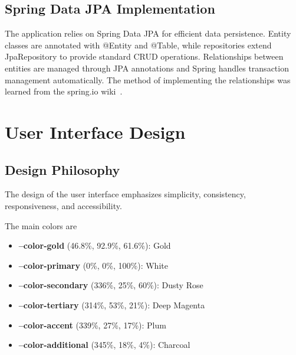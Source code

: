 \subsection{Spring Data JPA Implementation}\label{subsec:spring-data-jpa}

The application relies on Spring Data JPA for efficient data persistence.
Entity classes are annotated with @Entity and @Table, while repositories extend JpaRepository to provide standard CRUD operations.
Relationships between entities are managed through JPA annotations and Spring handles transaction management automatically.
The method of implementing the relationships was learned from the spring.io wiki~\cite{SpringDataJPA2024}.

\section{User Interface Design}\label{sec:ui-design}

\subsection{Design Philosophy}\label{subsec:design-philosophy}
The design of the user interface emphasizes simplicity, consistency, responsiveness, and accessibility.



The main colors are
\begin{itemize}
    \item \textcolor{colorGold}{\textbf{--color-gold} (46.8\%, 92.9\%, 61.6\%): Gold}
    \item \textbf{--color-primary} (0\%, 0\%, 100\%): White
    \item \textcolor{colorSecondary}{\textbf{--color-secondary} (336\%, 25\%, 60\%): Dusty Rose}
    \item \textcolor{colorTertiary}{\textbf{--color-tertiary} (314\%, 53\%, 21\%): Deep Magenta}
    \item \textcolor{colorAccent}{\textbf{--color-accent} (339\%, 27\%, 17\%): Plum}
    \item \textcolor{colorAdditional}{\textbf{--color-additional} (345\%, 18\%, 4\%): Charcoal}
\end{itemize}

